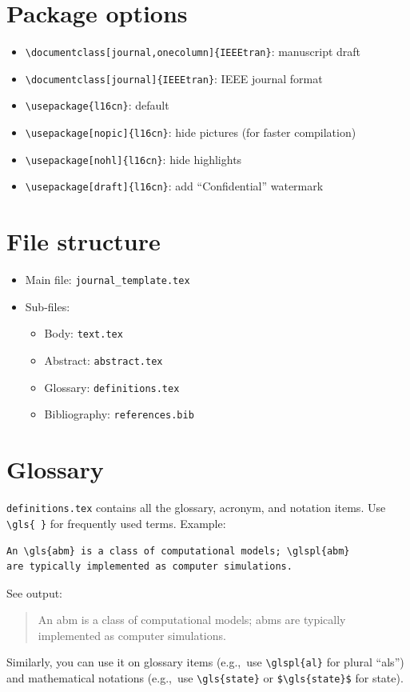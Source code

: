 
\section{Package options}
\begin{itemize}
	\item \verb|\documentclass[journal,onecolumn]{IEEEtran}|: manuscript draft
	\item \verb|\documentclass[journal]{IEEEtran}|: IEEE journal format
	\item \verb|\usepackage{l16cn}|: default
	\item \verb|\usepackage[nopic]{l16cn}|: hide pictures (for faster compilation)
	\item \verb|\usepackage[nohl]{l16cn}|: hide highlights
	\item \verb|\usepackage[draft]{l16cn}|: add ``Confidential'' watermark
\end{itemize}

\section{File structure}
\begin{itemize}
	\item Main file: \verb|journal_template.tex|
	\item Sub-files:
	\begin{itemize}
		\item Body: \verb|text.tex|
		\item Abstract: \verb|abstract.tex|
		\item Glossary: \verb|definitions.tex|
		\item Bibliography: \verb|references.bib|
	\end{itemize}
\end{itemize}

\section{Glossary}
\verb|definitions.tex| contains all the 
glossary, acronym, and notation items.
Use \verb|\gls{ }| for frequently used terms.
Example:
\begin{verbatim}
An \gls{abm} is a class of computational models; \glspl{abm} 
are typically implemented as computer simulations.
\end{verbatim}
See output:
\begin{quote}
An \gls{abm} is a class of computational models; \glspl{abm} 
are typically implemented as computer simulations.
\end{quote}
Similarly, you can use it on glossary items 
(e.g.,~use \verb|\glspl{al}| for plural ``\glspl{al}'')
and mathematical notations 
(e.g.,~use \verb|\gls{state}| or \verb|$\gls{state}$|
for \gls{state}).

